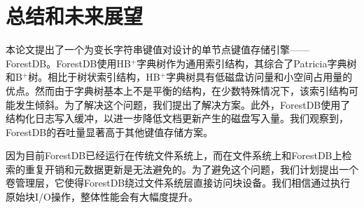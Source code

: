 \section{总结和未来展望}

本论文提出了一个为变长字符串键值对设计的单节点键值存储引擎——ForestDB。ForestDB使用HB$^+$字典树作为通用索引结构，其综合了Patricia字典树和B$^+$树。相比于树状索引结构，HB$^+$字典树具有低磁盘访问量和小空间占用量的优点。然而由于字典树基本上不是平衡的结构，在少数特殊情况下，该索引结构可能发生倾斜。为了解决这个问题，我们提出了解决方案。此外，ForestDB使用了结构化日志写入缓冲，以进一步降低文档更新产生的磁盘写入量。我们观察到，ForestDB的吞吐量显著高于其他键值存储方案。

因为目前ForestDB已经运行在传统文件系统上，而在文件系统上和ForestDB上检索的重复开销和元数据更新是无法避免的。为了避免这个问题，我们计划提出一个卷管理层，它使得ForestDB绕过文件系统层直接访问块设备。我们相信通过执行原始块I/O操作，整体性能会有大幅度提升。
